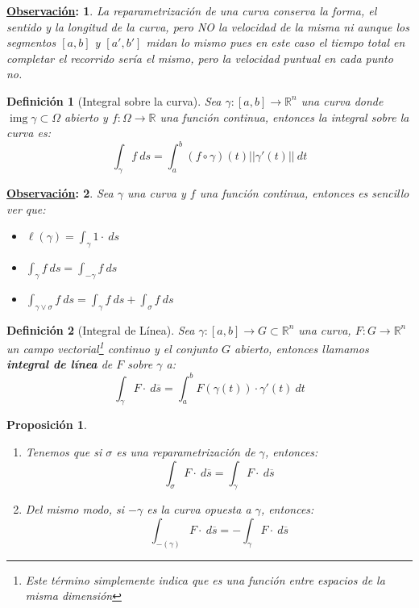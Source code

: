 \documentclass[10pt,a4paper,openright]{book}
\theoremstyle{break}
\newtheorem*{defi}{Definición}
\newtheorem*{prop}{Proposición}
\newtheorem*{obs}{\underline{Observación}:}
\DeclareMathOperator{\img}{img}
\newcommand{\dif}[1]{\ d#1}
\begin{document}
\begin{obs}
La reparametrización de una curva conserva la forma, el sentido y la longitud de la curva, pero NO la velocidad de la misma ni aunque los segmentos $[a,b]$ y $[a',b']$ midan lo mismo pues en este caso el tiempo total en completar el recorrido sería el mismo, pero la velocidad puntual en cada punto no.
\end{obs}

\begin{defi}[Integral sobre la curva]
Sea $\gamma: \left[ a, b \right] \rightarrow \mathbb{R}^n$ una curva donde $\img \gamma \subset \Omega$ abierto y $f: \Omega \rightarrow \mathbb{R}$ una función continua, entonces la integral sobre la curva es:
\[
\int_{\gamma} f \dif{s} = \int_{a}^{b} \left( f \circ \gamma \right) \left( t \right) \lvert \lvert \gamma'\left( t \right) \rvert \rvert \dif{t} 
\]
\end{defi}

\begin{obs}
Sea $\gamma$ una curva y $f$ una función continua, entonces es sencillo ver que: 
\begin{itemize}
    \item $\ell \left( \gamma \right) = \int_{\gamma} 1 \cdot \dif{s}$
    \item $\int_{\gamma} f \dif{s} = \int_{-\gamma} f \dif{s}$
    \item $\int_{\gamma \lor \sigma} f \dif{s} = \int_{\gamma} f \dif{s} + \int_{\sigma} f \dif{s}$
\end{itemize}
\end{obs}

\begin{defi}[Integral de Línea]
Sea $\gamma: \left[ a, b \right] \rightarrow G \subset \mathbb{R}^n$ una curva, $F: G \rightarrow \mathbb{R}^n$ un campo vectorial\footnote{Este término simplemente indica que es una función entre espacios de la misma dimensión} continuo y el conjunto $G$ abierto, entonces llamamos \textbf{integral de línea} de $F$ sobre $\gamma$ a:
$$\int_{\gamma} F \cdot \dif{\overline{s}} = \int_{a}^{b} F\left( \gamma\left( t \right) \right) \cdot \gamma'\left( t \right) \dif{t}$$
\end{defi}

\begin{prop}
\begin{enumerate}
   	\item Tenemos que si $\sigma$ es una reparametrización de $\gamma$, entonces: 
    $$\int_{\sigma} F \cdot \dif{\overline{s}} = \int_{\gamma} F\cdot \dif{\overline{s}}$$

    \item Del mismo modo, si $-\gamma$ es la curva opuesta a $\gamma$, entonces: 
    $$\int_{-\left( \gamma \right)} F \cdot \dif{\overline{s}} = -\int_{\gamma} F \cdot \dif{\overline{s}}$$
\end{enumerate}
\end{prop}
\end{document}
